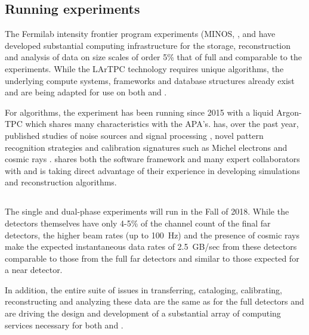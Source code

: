 \subsection{Running experiments}\label{sw:IF-input}

The Fermilab intensity frontier program experiments (MINOS\cite{minosNIM},  \cite{minerva}, \cite{microboone} and  \cite{Adamson:2016xxw} have developed substantial computing infrastructure for the storage, reconstruction and analysis of data on size scales of order 5\% that of full   and comparable to the  experiments. While the LArTPC technology requires unique algorithms, the underlying compute systems, frameworks and database structures already exist and are being adapted for use on both  and  .

For algorithms, the  \cite{Acciarri:2016smi} experiment has been running since 2015 with a liquid Argon-TPC which shares many characteristics with the   APA's.     has, over the past year, published studies of noise sources and signal processing \cite{Acciarri:2017sde,Adams:2018dra}, novel pattern recognition strategies \cite{Acciarri:2016ryt,Acciarri:2017hat} and calibration signatures such as Michel electrons and cosmic rays \cite{Acciarri:2017sjy,Acciarri:2017sde}.    shares both the \larsoft software framework and many expert collaborators with   and is taking direct advantage of their experience in developing simulations and reconstruction algorithms.


\subsection{}\label{sw:PD-planning}

The  single and dual-phase experiments will run in the Fall of 2018.  While the detectors themselves have only 4-5\% of the channel count  of the final far detectors, the higher beam rates (up to 100~Hz) and the presence of cosmic rays make the expected instantaneous data rates of 2.5~GB/sec from these detectors comparable to those from the full far detectors and similar to those expected for a near detector. 

In addition, the entire suite of issues in transferring, cataloging, calibrating, reconstructing and analyzing these data are the same as for the full detectors and are driving the design and development of a substantial array of computing services necessary for both  and  .

